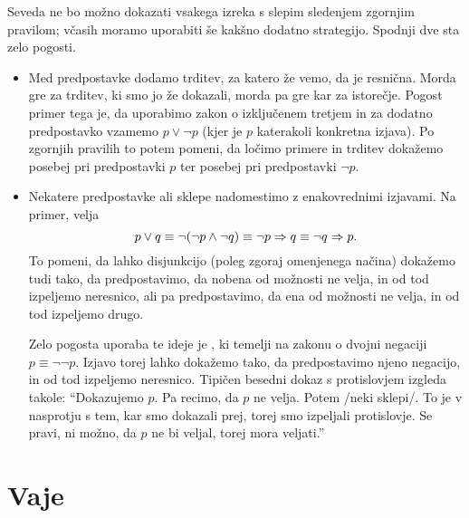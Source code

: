         Seveda ne bo možno dokazati vsakega izreka s slepim sledenjem zgornjim pravilom; včasih moramo uporabiti še kakšno dodatno strategijo. Spodnji dve sta zelo pogosti.
        \begin{itemize}
                \item
                        Med predpostavke dodamo trditev, za katero že vemo, da je resnična. Morda gre za trditev, ki smo jo že dokazali, morda pa gre kar za istorečje. Pogost primer tega je, da uporabimo zakon o izključenem tretjem in za dodatno predpostavko vzamemo $p \lor \lnot{p}$ (kjer je $p$ katerakoli konkretna izjava). Po zgornjih pravilih to potem pomeni, da ločimo primere in trditev dokažemo posebej pri predpostavki $p$ ter posebej pri predpostavki $\lnot{p}$.
                \item
                        Nekatere predpostavke ali sklepe nadomestimo z enakovrednimi izjavami. Na primer, velja
                        \[p \lor q \equiv \lnot(\lnot{p} \land \lnot{q}) \equiv \lnot{p} \Rightarrow q \equiv \lnot{q} \Rightarrow p.\]
                        To pomeni, da lahko disjunkcijo (poleg zgoraj omenjenega načina) dokažemo tudi tako, da predpostavimo, da nobena od možnosti ne velja, in od tod izpeljemo neresnico, ali pa predpostavimo, da ena od možnosti ne velja, in od tod izpeljemo drugo.

                        Zelo pogosta uporaba te ideje je , ki temelji na zakonu o dvojni negaciji $p \equiv \lnot\lnot{p}$. Izjavo torej lahko dokažemo tako, da predpostavimo njeno negacijo, in od tod izpeljemo neresnico. Tipičen besedni dokaz s protislovjem izgleda takole: ``Dokazujemo $p$. Pa recimo, da $p$ ne velja. Potem /neki sklepi/. To je v nasprotju s tem, kar smo dokazali prej, torej smo izpeljali protislovje. Se pravi, ni možno, da $p$ ne bi veljal, torej mora veljati.''
        \end{itemize}



\section{Vaje}


